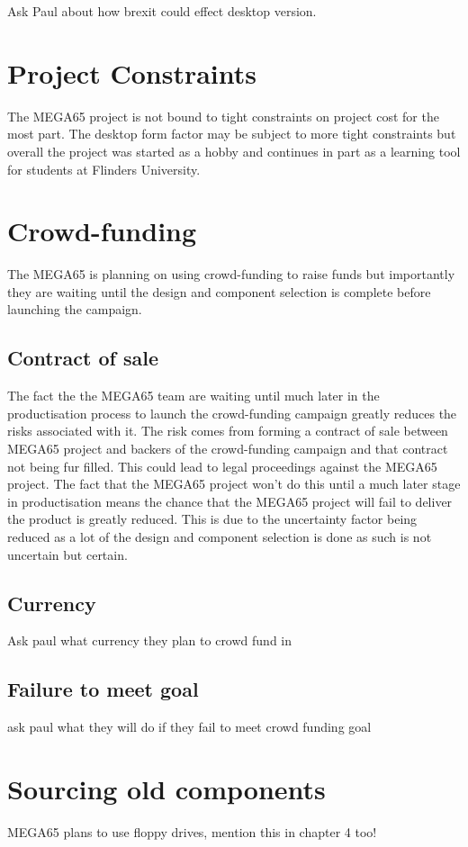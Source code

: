 Ask Paul about how brexit could effect desktop version.

\section{Project Constraints}
The MEGA65 project is not bound to tight constraints on project cost for the most part. The desktop form factor may be subject to more tight constraints but overall the project was started as a hobby and continues in part as a learning tool for students at Flinders University.

\section{Crowd-funding}
The MEGA65 is planning on using crowd-funding to raise funds but importantly they are waiting until the design and component selection is complete before launching the campaign.

\subsection{Contract  of sale}
The fact the the MEGA65 team are waiting until much later in the productisation process to launch the crowd-funding campaign greatly reduces the risks associated with it. The risk comes from forming a contract of sale between MEGA65 project and backers of the crowd-funding campaign and that contract not being fur filled. This could lead to legal proceedings against the MEGA65 project. The fact that the MEGA65 project won't do this until a much later stage in productisation means the chance that the MEGA65 project will fail to deliver the product is greatly reduced. This is due to the uncertainty factor being reduced as a lot of the design and component selection is done as such is not uncertain but certain.

\subsection{Currency}
Ask paul what currency they plan to crowd fund in


\subsection{Failure to meet goal}
ask paul what they will do if they fail to meet crowd funding goal

\section{Sourcing old components}
MEGA65 plans to use floppy drives, mention this in chapter 4 too!

